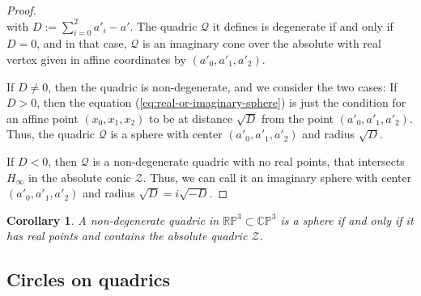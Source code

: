 \documentclass[10pt, a4paper]{article}
\theoremstyle{BoldTopSpacing}
\theoremstyle{BoldTopSpacing}
\theoremstyle{BoldTopSpacing}
\newtheorem{corollary}{Corollary}[theorem]
\theoremstyle{BoldTopBottomSpacing}
\theoremstyle{BoldTopSpacing}
\theoremstyle{BoldTopBottomSpacing}
\theoremstyle{remark}
\begin{document}
\begin{proof}
\begin{equation}
\end{equation}
with $D := \sum_{i = 0}^{2} a'_{i} - a'$. The quadric $\mathcal{Q}$ it defines is degenerate if and only if $D = 0$, and in that case, $\mathcal{Q}$ is an imaginary cone over the absolute with real vertex given in affine coordinates by $(a'_{0}, a'_{1}, a'_{2})$. \par
If $D \neq 0$, then the quadric is non-degenerate, and we consider the two cases: If $D > 0$, then the equation (\ref{eq:real-or-imaginary-sphere}) is just the condition for an affine point $(x_{0}, x_{1}, x_{2})$ to be at distance $\sqrt{D}$ from the point $(a'_{0}, a'_{1}, a'_{2})$. Thus, the quadric $\mathcal{Q}$ is a sphere with center $(a'_{0}, a'_{1}, a'_{2})$ and radius $\sqrt{D}$. \par
If $D < 0$, then $\mathcal{Q}$ is a non-degenerate quadric with no real points, that intersects $H_{\infty}$ in the absolute conic $\mathcal{Z}$. Thus, we can call it an imaginary sphere with center $(a'_{0}, a'_{1}, a'_{2})$ and radius $\sqrt{D} = i \sqrt{-D}$.
\end{proof}

\begin{corollary}
\label{col:spheres-contain-absolute}
A non-degenerate quadric in $\mathbb{R}\mathbb{P}^3 \subset \mathbb{C}\mathbb{P}^3$ is a sphere if and only if it has real points and contains the absolute quadric $\mathcal{Z}$.
\end{corollary}

\subsection{Circles on quadrics}
\label{subsec:circles-on-quadrics}
\end{document}
